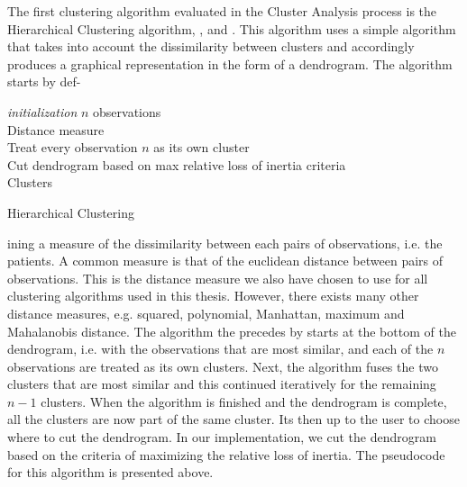 \documentclass[../thesis.tex]{subfiles}
\begin{document}
\noindent The first clustering algorithm evaluated in the Cluster Analysis process is the Hierarchical Clustering algorithm, \cite{sibson1973slink}, \cite{defays1977efficient} and \citep{rohlf198212}. This algorithm uses a simple algorithm that takes into account the dissimilarity between clusters and accordingly produces a graphical representation in the form of a dendrogram. The algorithm starts by def-\\
\begin{algorithm}[H]{
\SetAlgoLined
\textit{initialization}\;
\hspace*{0,5cm}$n$ observations\\
\hspace*{0,5cm}Distance measure\\
\hspace*{0,5cm}Treat every observation $n$ as its own cluster\\
}
Cut dendrogram based on max relative loss of inertia criteria\\
\Return Clusters
\caption{Hierarchical Clustering}
\end{algorithm}
\newpage
\noindent ining a measure of the dissimilarity between each pairs of observations, i.e. the patients. A common measure is that of the euclidean distance between pairs of observations. This is the distance measure we also have chosen to use for all clustering algorithms used in this thesis. However, there exists many other distance measures, e.g. squared, polynomial, Manhattan, maximum and Mahalanobis distance. The algorithm the precedes by starts at the bottom of the dendrogram, i.e. with the observations that are most similar, and each of the $n$ observations are treated as its own clusters. Next, the algorithm fuses the two clusters that are most similar and this continued iteratively for the remaining $n - 1$ clusters. When the algorithm is finished and the dendrogram is complete, all the clusters are now part of the same cluster. Its then up to the user to choose where to cut the dendrogram. In our implementation, we cut the dendrogram based on the criteria of maximizing the relative loss of inertia. The pseudocode for this algorithm is presented above.\\
\end{document}
